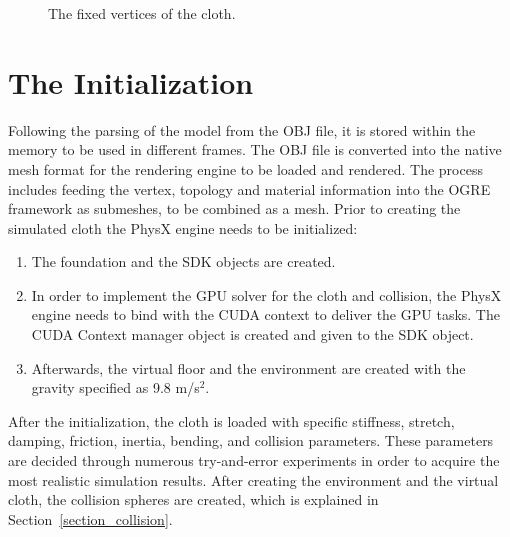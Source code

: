 \begin{figure}[h]
\centerline{}
\caption{The fixed vertices of the cloth.}
\label{fig:cloth_fixed_vertices}
\end{figure}

\section{The Initialization}

Following the parsing of the model from the OBJ file, it is stored within the memory to be used in different frames. The OBJ file is converted into the native mesh format for the rendering engine to be loaded and rendered. The process includes feeding the vertex, topology and material information into the OGRE framework as submeshes, to be combined as a mesh. Prior to creating the simulated cloth the PhysX engine needs to be initialized:

\begin{enumerate}
\item The foundation and the SDK objects are created.
\item In order to implement the GPU solver for the cloth and collision, the PhysX engine needs to bind with the CUDA context to deliver the GPU tasks. The CUDA Context manager object is created and given to the SDK object.
\item Afterwards, the virtual floor and the environment are created with the gravity specified as 9.8 m/s$^2$. 
\end{enumerate}

After the initialization, the cloth is loaded with specific stiffness, stretch, damping, friction, inertia, bending, and collision parameters. These parameters are decided through numerous try-and-error experiments in order to acquire the most realistic simulation results. After creating the environment and the virtual cloth, the collision spheres are created, which is explained in Section~\ref{section_collision}.

